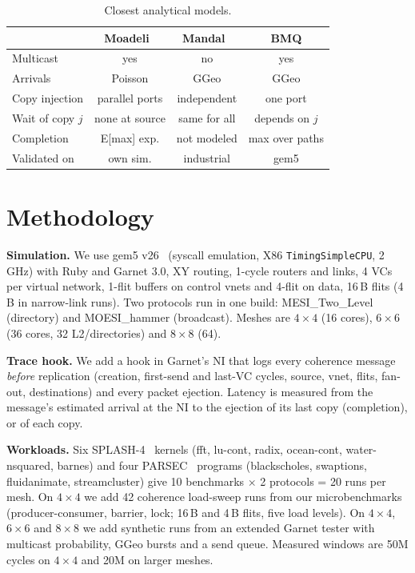 \documentclass[conference]{IEEEtran}
\begin{document}
\begin{table}[t]
\centering\footnotesize
\caption{Closest analytical models.}\label{tab:related}
\begin{tabular}{@{}lccc@{}}
\toprule
 & Moadeli~\cite{moadeli2009multicast} & Mandal~\cite{mandal2020bursty} & BMQ \\
\midrule
Multicast & yes & no & yes \\
Arrivals & Poisson & GGeo & GGeo \\
Copy injection & parallel ports & independent & one port \\
Wait of copy $j$ & none at source & same for all & depends on $j$ \\
Completion & E[max] exp. & not modeled & max over paths \\
Validated on & own sim. & industrial & gem5 \\
\bottomrule
\end{tabular}
\end{table}

\section{Methodology}
\textbf{Simulation.} We use gem5 v26~\cite{binkert2011gem5} (syscall emulation, X86 \texttt{TimingSimpleCPU}, 2\,GHz) with Ruby and Garnet 3.0, XY routing, 1-cycle routers and links, 4 VCs per virtual network, 1-flit buffers on control vnets and 4-flit on data, 16\,B flits (4\,B in narrow-link runs). Two protocols run in one build: MESI\_Two\_Level (directory) and MOESI\_hammer (broadcast). Meshes are $4{\times}4$ (16 cores), $6{\times}6$ (36 cores, 32 L2/directories) and $8{\times}8$ (64).

\textbf{Trace hook.} We add a hook in Garnet's NI that logs every coherence message \emph{before} replication (creation, first-send and last-VC cycles, source, vnet, flits, fan-out, destinations) and every packet ejection. Latency is measured from the message's estimated arrival at the NI to the ejection of its last copy (completion), or of each copy.

\textbf{Workloads.} Six SPLASH-4~\cite{gomezhernandez2022splash4} kernels (fft, lu-cont, radix, ocean-cont, water-nsquared, barnes) and four PARSEC~\cite{bienia2008parsec} programs (blackscholes, swaptions, fluidanimate, streamcluster) give 10 benchmarks $\times$ 2 protocols = 20 runs per mesh. On $4{\times}4$ we add 42 coherence load-sweep runs from our microbenchmarks (producer-consumer, barrier, lock; 16\,B and 4\,B flits, five load levels). On $4{\times}4$, $6{\times}6$ and $8{\times}8$ we add synthetic runs from an extended Garnet tester with multicast probability, GGeo bursts and a send queue. Measured windows are 50M cycles on $4{\times}4$ and 20M on larger meshes.
\end{document}
